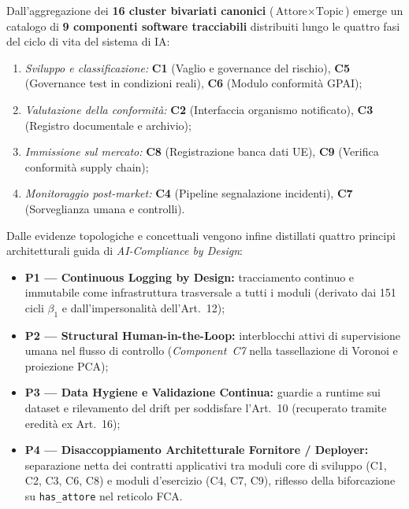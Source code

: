 \documentclass[12pt,a4paper,oneside]{article}
\begin{document}
Dall'aggregazione dei \textbf{16 cluster bivariati canonici} ($\text{Attore} \times \text{Topic}$) emerge un catalogo di \textbf{9 componenti software tracciabili} distribuiti lungo le quattro fasi del ciclo di vita del sistema di IA:
\begin{enumerate}
    \item \emph{Sviluppo e classificazione:} \textbf{C1} (Vaglio e governance del rischio), \textbf{C5} (Governance test in condizioni reali), \textbf{C6} (Modulo conformità GPAI);
    \item \emph{Valutazione della conformità:} \textbf{C2} (Interfaccia organismo notificato), \textbf{C3} (Registro documentale e archivio);
    \item \emph{Immissione sul mercato:} \textbf{C8} (Registrazione banca dati UE), \textbf{C9} (Verifica conformità supply chain);
    \item \emph{Monitoraggio post-market:} \textbf{C4} (Pipeline segnalazione incidenti), \textbf{C7} (Sorveglianza umana e controlli).
\end{enumerate}

Dalle evidenze topologiche e concettuali vengono infine distillati quattro principi architetturali guida di \emph{AI-Compliance by Design}:
\begin{itemize}
    \item \textbf{P1 --- Continuous Logging by Design:} tracciamento continuo e immutabile come infrastruttura trasversale a tutti i moduli (derivato dai 151 cicli $\beta_1$ e dall'impersonalità dell'Art.~12);
    \item \textbf{P2 --- Structural Human-in-the-Loop:} interblocchi attivi di supervisione umana nel flusso di controllo (\emph{Component~C7} nella tassellazione di Voronoi e proiezione PCA);
    \item \textbf{P3 --- Data Hygiene e Validazione Continua:} guardie a runtime sui dataset e rilevamento del drift per soddisfare l'Art.~10 (recuperato tramite eredità ex Art.~16);
    \item \textbf{P4 --- Disaccoppiamento Architetturale Fornitore / Deployer:} separazione netta dei contratti applicativi tra moduli core di sviluppo (C1, C2, C3, C6, C8) e moduli d'esercizio (C4, C7, C9), riflesso della biforcazione su \texttt{has\_attore} nel reticolo FCA.
\end{itemize}

\end{document}
